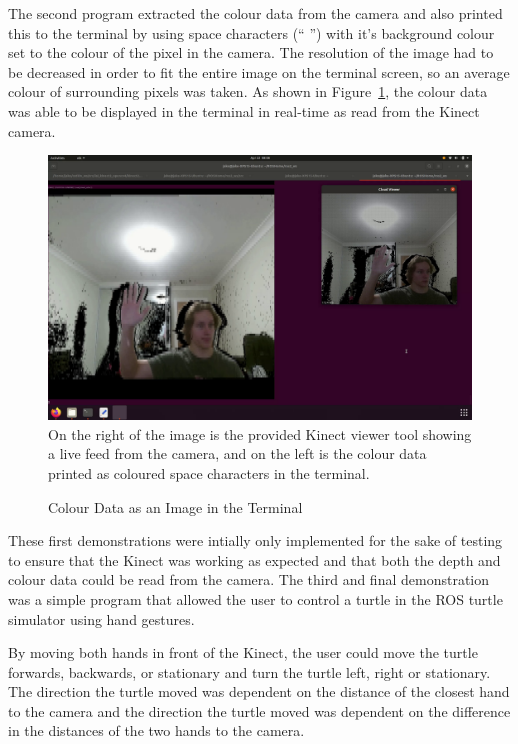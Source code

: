 The second program extracted the colour data from the camera and also printed this to the terminal by using space characters (`` '') with it's background colour set to the colour of the pixel in the camera.
The resolution of the image had to be decreased in order to fit the entire image on the terminal screen, so an average colour of surrounding pixels was taken.
As shown in Figure~\ref{fig:colour_image}, the colour data was able to be displayed in the terminal in real-time as read from the Kinect camera.

\begin{figure}[!htb]
    \caption{Colour Data as an Image in the Terminal}
    \includegraphics[width=\textwidth]{Colour Data Demo.png}
    \small
    On the right of the image is the provided Kinect viewer tool showing a live feed from the camera, and on the left is the colour data printed as coloured space characters in the terminal.
    \label{fig:colour_image}
\end{figure}

These first demonstrations were intially only implemented for the sake of testing to ensure that the Kinect was working as expected and that both the depth and colour data could be read from the camera.
The third and final demonstration was a simple program that allowed the user to control a turtle in the ROS turtle simulator using hand gestures.

By moving both hands in front of the Kinect, the user could move the turtle forwards, backwards, or stationary and turn the turtle left, right or stationary.
The direction the turtle moved was dependent on the distance of the closest hand to the camera and the direction the turtle moved was dependent on the difference in the distances of the two hands to the camera.

